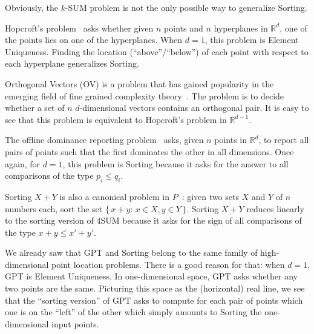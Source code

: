 Obviously, the \(k\)-SUM problem is not the only possible way to generalize
Sorting.

Hopcroft's problem~\cite[Section~1]{Er96} asks whether given \(n\) points and \(n\) hyperplanes in
\(\mathbb{R}^d\), one of the points lies on one of the hyperplanes. When
\(d=1\), this problem is Element Uniqueness. Finding the location
(``above''/``below'')
of each point with respect to each hyperplane generalizes Sorting.

Orthogonal Vectors (OV) is a problem that has gained popularity in the emerging field
of fine grained complexity theory~\cite[Section~5.1]{Wil05}. The problem is to decide
whether a set of \(n\) \(d\)-dimensional vectors contains an orthogonal pair.
It is easy to see that this problem is equivalent to Hopcroft's problem in
\(\mathbb{R}^{d-1}\).

The offline dominance reporting problem~\cite[Section~2]{Cha08} asks,
given \(n\) points in \(\mathbb{R}^d\),
to report all pairs of points such that the first dominates the other in all
dimensions. Once again, for \(d=1\), this problem is Sorting because it asks
for the answer to all comparisons of the type \(p_i \leq q_i\).

Sorting \(X+Y\) is also a canonical problem in \(P\)~\cite{HPSS75,Fr76}:
given two sets \(X\) and \( Y \) of \( n \) numbers each, sort the set \( \{\,
x + y \colon\, x \in X, y \in Y\,\} \). Sorting \(X+Y\) reduces linearly to the
sorting version of 4SUM because it asks for the sign of all comparisons of the
type \(x+y \leq x'+y'\).

We already saw that GPT and Sorting belong to the same family of
high-dimensional point location problems. There is a good reason for that: when
\(d=1\), GPT is Element Uniqueness. In one-dimensional space, GPT
asks whether any two points are the same. Picturing this space as
the (horizontal) real line, we see that the ``sorting version'' of GPT asks to
compute for each pair of points which one is on the ``left'' of the other which
simply amounts to Sorting the one-dimensional input points.

